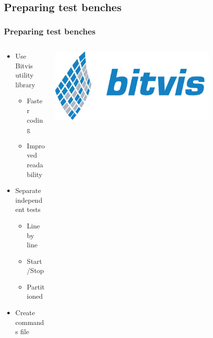 \documentclass[british,10pt]{beamer}
\begin{document}
\subsection{Preparing test benches}
\begin{frame}\frametitle{Preparing test benches}
\begin{columns}
\begin{column}{0.6\textwidth}
\begin{itemize}
\item Use Bitvis utility library
\begin{itemize}
\item Faster coding
\item Improved readability
\end{itemize}
\item Separate independent tests
\begin{itemize}
\item Line by line
\item Start/Stop
\item Partitioned
\end{itemize}
\item Create commands file
\end{itemize}
\end{column}
\includegraphics[width=0.8\textwidth]{images/bitvis.png}
\end{columns}
\end{frame}
\end{document}
